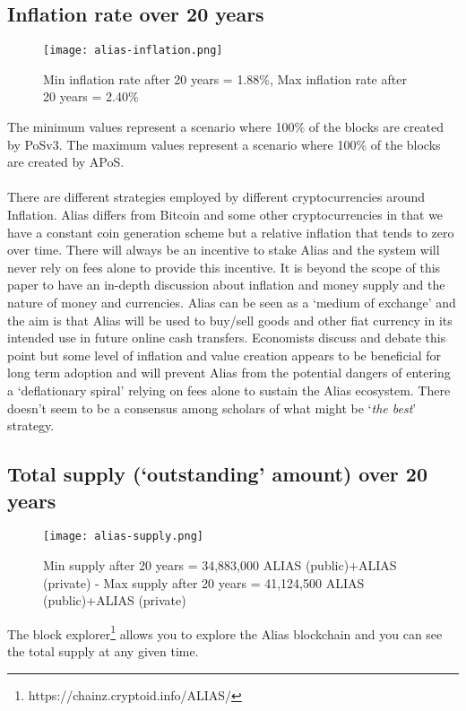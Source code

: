 \subsection{Inflation rate over 20 years}
\begin{figure}[h!]
	\centering
	\texttt{[image: alias-inflation.png]}
	\caption{Min inflation rate after 20 years = 1.88\%, Max inflation
	rate after 20 years = 2.40\% }
\end{figure}
\noindent
The minimum values represent a scenario where 100\% of the blocks
are created by PoSv3.
\linebreak
The maximum values represent a scenario where 100\%
of the blocks are created by APoS.
\\
\\
There are different strategies employed by different cryptocurrencies around
Inflation. Alias differs from Bitcoin and some other
cryptocurrencies in that we have a constant coin generation scheme
but a relative inflation that tends to zero over time. There will
always be an incentive to stake Alias and the system will never
rely on fees alone to provide this incentive. It is beyond the scope
of this paper to have an in-depth discussion about inflation and money
supply and the nature of money and currencies. Alias can be seen
as a ‘medium of exchange’ and the aim is that Alias will be used
to buy/sell goods and other fiat currency in its intended use in future
online cash transfers. Economists discuss and debate this point but some
level of inflation and value creation appears to be beneficial for long
term adoption and will prevent Alias from the potential dangers of
entering a ‘deflationary spiral’ relying on fees alone to sustain the
Alias ecosystem. There doesn’t seem to be a consensus among
scholars of what might be ‘\textit{the best}’ strategy.
\newpage

\subsection{Total supply (‘outstanding’ amount) over 20 years}
\begin{figure}[ht]
	\centering
	\texttt{[image: alias-supply.png]}
	\caption{Min supply after 20 years = 34,883,000 ALIAS (public)+ALIAS (private) - Max 
		supply after 20 years = 41,124,500 ALIAS (public)+ALIAS (private)}
\end{figure}
\noindent
The block explorer\footnote{https://chainz.cryptoid.info/ALIAS/} allows you 
to explore the Alias blockchain and you can see the total supply at any given time.

